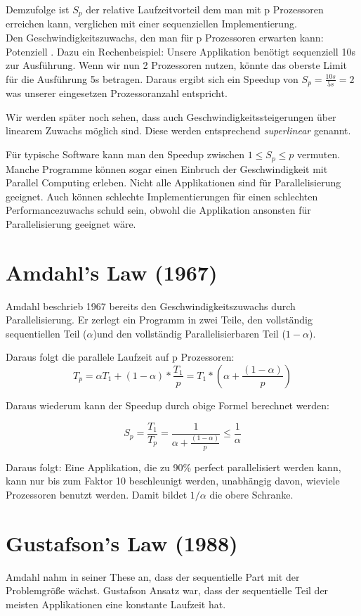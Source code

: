 \documentclass[twocolumn, a4paper, 10pt, DIV12]{scrreprt}
\begin{document}
Demzufolge ist \(S_p\) der relative Laufzeitvorteil dem man mit p Prozessoren erreichen kann, verglichen
mit einer sequenziellen Implementierung.\\

Den Geschwindigkeitszuwachs, den man für p Prozessoren erwarten kann: Potenziell .
Dazu ein Rechenbeispiel: Unsere Applikation benötigt sequenziell 10s zur Ausführung. Wenn wir
nun 2 Prozessoren nutzen, könnte das oberste Limit für die Ausführung 5s betragen. Daraus ergibt
sich ein Speedup von \( S_p = \frac{10s}{5s} = 2 \) was unserer eingesetzen Prozessoranzahl entspricht.

Wir werden später noch sehen, dass auch Geschwindigkeitssteigerungen über linearem Zuwachs möglich sind.
Diese werden entsprechend \textit{superlinear} genannt.

Für typische Software kann man den Speedup zwischen \( 1 \leq S_p \leq p \) vermuten. Manche Programme
können sogar einen Einbruch der Geschwindigkeit mit Parallel Computing erleben. Nicht alle Applikationen
sind für Parallelisierung geeignet. Auch können schlechte Implementierungen für einen schlechten
Performancezuwachs schuld sein, obwohl die Applikation ansonsten für Parallelisierung geeignet wäre.

\section*{Amdahl's Law (1967)}
Amdahl beschrieb 1967 bereits den Geschwindigkeitszuwachs durch Parallelisierung. Er zerlegt ein Programm
in zwei Teile, den vollständig sequentiellen Teil (\(\alpha\))und den vollständig Parallelisierbaren Teil (\(1-\alpha\)).

Daraus folgt die parallele Laufzeit auf p Prozessoren:
\[ T_p = \alpha T_1 + (1-\alpha)*\frac{T_1}{p} = T_1 * (\alpha + \frac{(1-\alpha)}{p})\]

Daraus wiederum kann der Speedup durch obige Formel berechnet werden:

\[ S_p = \frac{T_1}{T_p} = \frac{1}{\alpha+\frac{(1-\alpha)}{p}} \leq \frac{1}{\alpha} \]

Daraus folgt: Eine Applikation, die zu 90\% perfect parallelisiert werden kann, kann nur bis zum
Faktor 10 beschleunigt werden, unabhängig davon, wieviele Prozessoren benutzt werden. Damit
bildet \(1/\alpha\) die obere Schranke.

\section*{Gustafson's Law (1988)}
Amdahl nahm in seiner These an, dass der sequentielle Part mit der Problemgröße wächst. Gustafson
Ansatz war, dass der sequentielle Teil der meisten Applikationen eine konstante Laufzeit hat.
\end{document}
